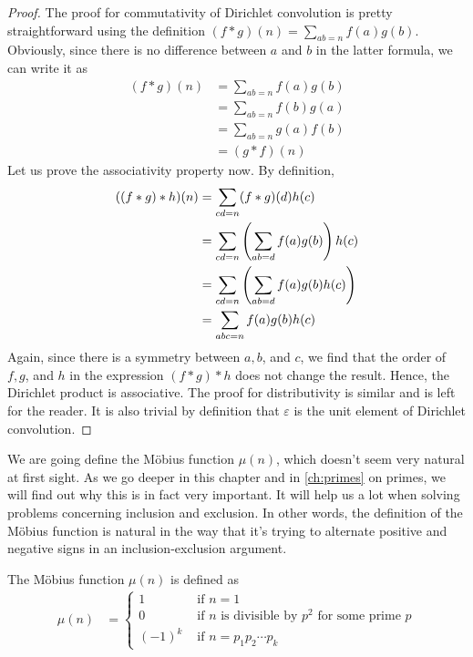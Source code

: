 	\begin{proof}
		The proof for commutativity of Dirichlet convolution is pretty straightforward using the definition $(f\ast g)(n)=\displaystyle\sum_{ab=n}f(a)g(b)$. Obviously, since there is no difference between $a$ and $b$ in the latter formula, we can write it as
			\begin{align*}
				(f\ast g)(n)
					& = \sum_{ab=n}f(a)g(b)\\
					& = \sum_{ab=n}f(b)g(a)\\
					& =\sum_{ab=n}g(a)f(b)\\
					& =(g\ast f)(n)
			\end{align*}
		Let us prove the associativity property now. By definition,
			\begin{align*}
				((f \ast g) \ast h)(n) & = \sum_{cd=n} (f\ast g)(d) h(c)\\
						   & = \sum_{cd=n}\left(\sum_{ab=d} f(a)g(b)\right) h(c)\\
						   & = \sum_{cd=n}\left(\sum_{ab=d} f(a)g(b) h(c)\right)\\
						   & = \sum_{abc=n} f(a)g(b) h(c)
			\end{align*}
		Again, since there is a symmetry between $a,b$, and $c$, we find that the order of $f,g$, and $h$ in the expression $(f \ast g) \ast h$ does not change the result. Hence, the Dirichlet product is associative.
		The proof for distributivity is similar and is left for the reader. It is also trivial by definition that $\varepsilon$ is the unit element of Dirichlet convolution.
	\end{proof}

	We are going define the M\"{o}bius function $\mu(n)$, which doesn't seem very natural at first sight. As we go deeper in this chapter and in \autoref{ch:primes} on primes, we will find out why this is in fact very important. It will help us a lot when solving problems concerning inclusion and exclusion. In other words, the definition of the M\"{o}bius function is natural in the way that it's trying to alternate positive and negative signs in an inclusion-exclusion argument.

	\begin{definition}\label{def:mobius}
		The M\"{o}bius function $\mu(n)$ is defined as
			\begin{align*}
				\mu(n)
					& =
					\begin{cases}
						1&\mbox{ if }n=1\\
						0&\mbox{ if }n\mbox{ is divisible by }p^2\mbox{ for some prime }p\\
						(-1)^k&\mbox{ if }n=p_1p_2\cdots p_k
					\end{cases}
			\end{align*}
	\end{definition}

